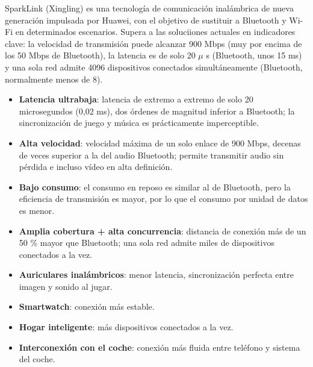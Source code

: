 
SparkLink (Xingling) es una tecnología de comunicación inalámbrica de nueva generación impulsada por Huawei, con el objetivo de sustituir a Bluetooth y Wi-Fi en determinados escenarios. Supera a las soluciiones actuales en indicadores clave: la velocidad de transmisión puede alcanzar 900 Mbps (muy por encima de los 50 Mbps de Bluetooth), la latencia es de solo 20 $\mu$ s (Bluetooth, unos 15 ms) y una sola red admite 4096 dispositivos conectados simultáneamente (Bluetooth, normalmente menos de 8).


\begin{itemize}
  \item \textbf{Latencia ultrabaja}: latencia de extremo a extremo de solo 20 microsegundos (0,02 ms), dos órdenes de magnitud inferior a Bluetooth; la sincronización de juego y música es prácticamente imperceptible.
  \item \textbf{Alta velocidad}: velocidad máxima de un solo enlace de 900 Mbps, decenas de veces superior a la del audio Bluetooth; permite transmitir audio sin pérdida e incluso vídeo en alta definición.
  \item \textbf{Bajo consumo}: el consumo en reposo es similar al de Bluetooth, pero la eficiencia de transmisión es mayor, por lo que el consumo por unidad de datos es menor.
  \item \textbf{Amplia cobertura + alta concurrencia}: distancia de conexión más de un 50 \% mayor que Bluetooth; una sola red admite miles de dispositivos conectados a la vez.
\end{itemize}


\begin{itemize}
  \item \textbf{Auriculares inalámbricos}: menor latencia, sincronización perfecta entre imagen y sonido al jugar.
  \item \textbf{Smartwatch}: conexión más estable.
  \item \textbf{Hogar inteligente}: más dispositivos conectados a la vez.
  \item \textbf{Interconexión con el coche}: conexión más fluida entre teléfono y sistema del coche.
\end{itemize}


